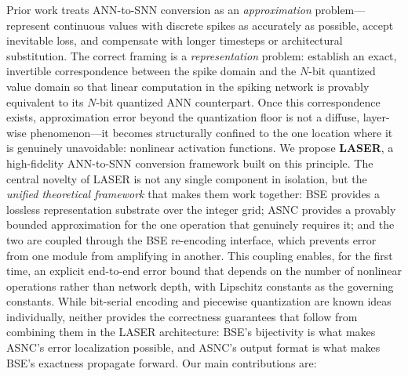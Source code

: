 \documentclass{article}
\theoremstyle{plain}
\theoremstyle{definition}
\theoremstyle{remark}
\begin{document}
Prior work treats ANN-to-SNN conversion as an \emph{approximation} problem---represent
continuous values with discrete spikes as accurately as possible, accept inevitable loss, and compensate with longer timesteps or architectural substitution. The correct framing is a \emph{representation} problem: establish an exact, invertible correspondence between the spike domain and the $N$-bit quantized value domain so that linear computation in the spiking network is provably equivalent to its $N$-bit quantized ANN counterpart. Once this correspondence exists, approximation error beyond the quantization floor is not a diffuse, layer-wise phenomenon---it becomes structurally confined to the one location where it is genuinely unavoidable: nonlinear activation functions.
%
We propose \textbf{LASER}, a high-fidelity ANN-to-SNN conversion framework built on
this principle. The central novelty of LASER is not any single component in isolation,
but the \emph{unified theoretical framework} that makes them work together: BSE
provides a lossless representation substrate over the integer grid; ASNC provides a
provably bounded approximation for the one operation that genuinely requires it; and
the two are coupled through the BSE re-encoding interface, which prevents error from
one module from amplifying in another. This coupling enables, for the first time, an
explicit end-to-end error bound that depends on the number of nonlinear operations
rather than network depth, with Lipschitz constants as the governing constants.
While bit-serial encoding and piecewise quantization are known ideas individually,
neither provides the correctness guarantees that follow from combining them in the
LASER architecture: BSE's bijectivity is what makes ASNC's error localization
possible, and ASNC's output format is what makes BSE's exactness propagate forward.
Our main contributions are:
\end{document}
